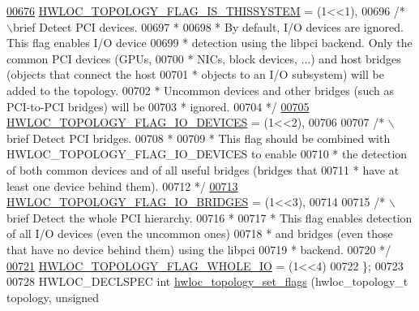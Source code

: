 \begin{DoxyCode}
\hypertarget{a00033_source_l00676}{}\hyperlink{a00044_ggada025d3ec20b4b420f8038d23d6e7bdea6ecb6abc6a0bb75e81564f8bca85783b}{00676}   \hyperlink{a00044_ggada025d3ec20b4b420f8038d23d6e7bdea6ecb6abc6a0bb75e81564f8bca85783b}{HWLOC_TOPOLOGY_FLAG_IS_THISSYSTEM} = (1<<1),
00696   \textcolor{comment}{/* \(\backslash\)brief Detect PCI devices.}
00697 \textcolor{comment}{   *}
00698 \textcolor{comment}{   * By default, I/O devices are ignored. This flag enables I/O device}
00699 \textcolor{comment}{   * detection using the libpci backend. Only the common PCI devices (GPUs,}
00700 \textcolor{comment}{   * NICs, block devices, ...) and host bridges (objects that connect the host}
00701 \textcolor{comment}{   * objects to an I/O subsystem) will be added to the topology.}
00702 \textcolor{comment}{   * Uncommon devices and other bridges (such as PCI-to-PCI bridges) will be}
00703 \textcolor{comment}{   * ignored.}
00704 \textcolor{comment}{   */}
\hypertarget{a00033_source_l00705}{}\hyperlink{a00044_ggada025d3ec20b4b420f8038d23d6e7bdea46ae25e8896278840b1800ae9ce4de41}{00705}   \hyperlink{a00044_ggada025d3ec20b4b420f8038d23d6e7bdea46ae25e8896278840b1800ae9ce4de41}{HWLOC_TOPOLOGY_FLAG_IO_DEVICES} = (1<<2),
00706 
00707   \textcolor{comment}{/* \(\backslash\)brief Detect PCI bridges.}
00708 \textcolor{comment}{   *}
00709 \textcolor{comment}{   * This flag should be combined with HWLOC\_TOPOLOGY\_FLAG\_IO\_DEVICES to enable}
00710 \textcolor{comment}{   * the detection of both common devices and of all useful bridges (bridges that
      }
00711 \textcolor{comment}{   * have at least one device behind them).}
00712 \textcolor{comment}{   */}
\hypertarget{a00033_source_l00713}{}\hyperlink{a00044_ggada025d3ec20b4b420f8038d23d6e7bdea426b18c349f15d7046bb391d96fa947c}{00713}   \hyperlink{a00044_ggada025d3ec20b4b420f8038d23d6e7bdea426b18c349f15d7046bb391d96fa947c}{HWLOC_TOPOLOGY_FLAG_IO_BRIDGES} = (1<<3),
00714 
00715   \textcolor{comment}{/* \(\backslash\)brief Detect the whole PCI hierarchy.}
00716 \textcolor{comment}{   *}
00717 \textcolor{comment}{   * This flag enables detection of all I/O devices (even the uncommon ones)}
00718 \textcolor{comment}{   * and bridges (even those that have no device behind them) using the libpci}
00719 \textcolor{comment}{   * backend.}
00720 \textcolor{comment}{   */}
\hypertarget{a00033_source_l00721}{}\hyperlink{a00044_ggada025d3ec20b4b420f8038d23d6e7bdea4a41dc181649ef81c2dcd44a54e271b9}{00721}   \hyperlink{a00044_ggada025d3ec20b4b420f8038d23d6e7bdea4a41dc181649ef81c2dcd44a54e271b9}{HWLOC_TOPOLOGY_FLAG_WHOLE_IO} = (1<<4)
00722 \};
00723 
00728 HWLOC\_DECLSPEC \textcolor{keywordtype}{int} \hyperlink{a00044_ga6d11e53db143ac39c32cdb3912b71f99}{hwloc_topology_set_flags} (hwloc\_topology\_t topology, \textcolor{keywordtype}{unsigned} 

\end{DoxyCode}
